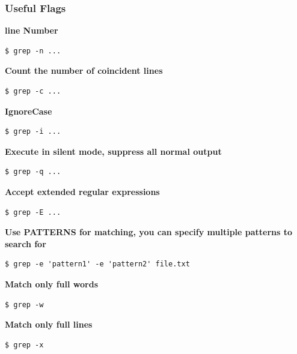 \documentclass{article}
\newenvironment{codetemplate}[1][]{%
  \mybasecolorbox[#1]
  \itshape
}{%
  \endmybasecolorbox
}
\begin{document}
\subsubsection{Useful Flags}

\textbf{line Number}
\begin{codetemplate}{}
\begin{verbatim}
$ grep -n ...
\end{verbatim}
\end{codetemplate}

\textbf{Count the number of coincident lines}
\begin{codetemplate}{}
\begin{verbatim}
$ grep -c ...
\end{verbatim}
\end{codetemplate}

\textbf{IgnoreCase}
\begin{codetemplate}{}
\begin{verbatim}
$ grep -i ...
\end{verbatim}
\end{codetemplate}

\textbf{Execute in silent mode, suppress all normal output}
\begin{codetemplate}{}
\begin{verbatim}
$ grep -q ...
\end{verbatim}
\end{codetemplate}

\textbf{Accept extended regular expressions}
\begin{codetemplate}{}
\begin{verbatim}
$ grep -E ...
\end{verbatim}
\end{codetemplate}

\textbf{Use PATTERNS for matching, you can specify multiple patterns to search for}
\begin{codetemplate}{}
\begin{verbatim}
$ grep -e 'pattern1' -e 'pattern2' file.txt
\end{verbatim}
\end{codetemplate}

\textbf{Match only full words}
\begin{codetemplate}{}
\begin{verbatim}
$ grep -w
\end{verbatim}
\end{codetemplate}

\textbf{Match only full lines}
\begin{codetemplate}{}
\begin{verbatim}
$ grep -x
\end{verbatim}
\end{codetemplate}
\end{document}
